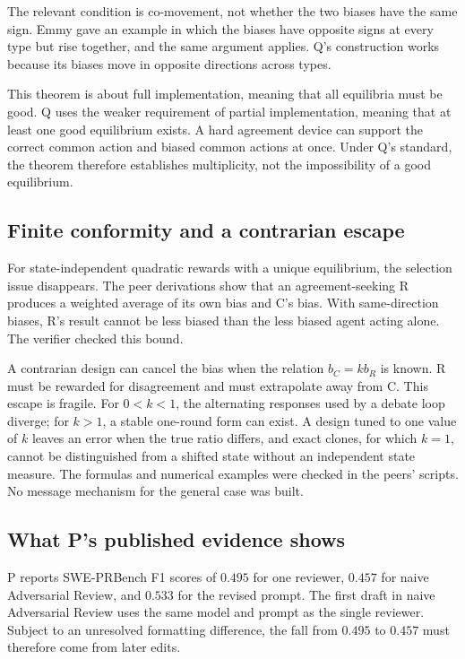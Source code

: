 \documentclass{article}
\begin{document}
The relevant condition is co-movement, not whether the two biases have the same sign. Emmy gave an example in which the biases have opposite signs at every type but rise together, and the same argument applies. Q's construction works because its biases move in opposite directions across types.

This theorem is about full implementation, meaning that all equilibria must be good. Q uses the weaker requirement of partial implementation, meaning that at least one good equilibrium exists. A hard agreement device can support the correct common action and biased common actions at once. Under Q's standard, the theorem therefore establishes multiplicity, not the impossibility of a good equilibrium.

\subsection{Finite conformity and a contrarian escape}

For state-independent quadratic rewards with a unique equilibrium, the selection issue disappears. The peer derivations show that an agreement-seeking R produces a weighted average of its own bias and C's bias. With same-direction biases, R's result cannot be less biased than the less biased agent acting alone. The verifier checked this bound.

A contrarian design can cancel the bias when the relation $b_C=k b_R$ is known. R must be rewarded for disagreement and must extrapolate away from C. This escape is fragile. For $0<k<1$, the alternating responses used by a debate loop diverge; for $k>1$, a stable one-round form can exist. A design tuned to one value of $k$ leaves an error when the true ratio differs, and exact clones, for which $k=1$, cannot be distinguished from a shifted state without an independent state measure. The formulas and numerical examples were checked in the peers' scripts. No message mechanism for the general case was built.

\subsection{What P's published evidence shows}

P reports SWE-PRBench F1 scores of $0.495$ for one reviewer, $0.457$ for naive Adversarial Review, and $0.533$ for the revised prompt. The first draft in naive Adversarial Review uses the same model and prompt as the single reviewer. Subject to an unresolved formatting difference, the fall from $0.495$ to $0.457$ must therefore come from later edits.
\end{document}
